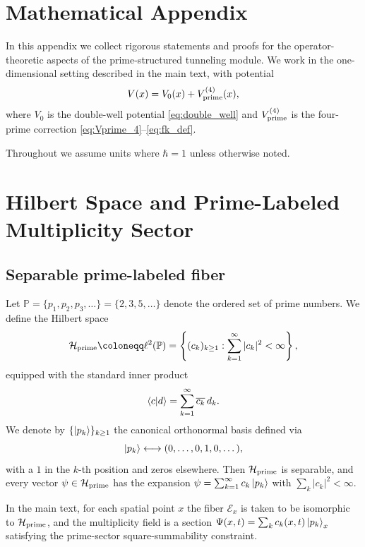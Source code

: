 \documentclass[11pt]{article}
\begin{document}
\appendix
\section*{Mathematical Appendix}

In this appendix we collect rigorous statements and proofs for the
operator-theoretic aspects of the prime-structured tunneling module.
We work in the one-dimensional setting described in the main text, with
potential
\[
  V(x) = V_0(x) + V_{\rm prime}^{(4)}(x),
\]
where \(V_0\) is the double-well potential \eqref{eq:double_well} and
\(V_{\rm prime}^{(4)}\) is the four-prime correction
\eqref{eq:Vprime_4}--\eqref{eq:fk_def}.

Throughout we assume units where \(\hbar = 1\) unless otherwise noted.

\section{Hilbert Space and Prime-Labeled Multiplicity Sector}

\subsection{Separable prime-labeled fiber}

Let \(\mathbb{P} = \{p_1,p_2,p_3,\dots\} = \{2,3,5,\dots\}\) denote the
ordered set of prime numbers. We define the Hilbert space
\begin{equation}
  \mathcal{H}_{\rm prime} \coloneqq \ell^2(\mathbb{P})
  = \left\{ (c_k)_{k\ge 1} : \sum_{k=1}^{\infty} |c_k|^2 < \infty \right\},
\end{equation}
equipped with the standard inner product
\begin{equation}
  \braket{c}{d}
  = \sum_{k=1}^{\infty} \overline{c_k}\,d_k.
\end{equation}
We denote by \(\{\ket{p_k}\}_{k\ge 1}\) the canonical orthonormal basis
defined via
\begin{equation}
  \ket{p_k} \longleftrightarrow (0,\dots,0,1,0,\dots),
\end{equation}
with a \(1\) in the \(k\)-th position and zeros elsewhere. Then
\(\mathcal{H}_{\rm prime}\) is separable, and every vector
\(\psi \in \mathcal{H}_{\rm prime}\) has the expansion
\(\psi = \sum_{k=1}^\infty c_k \ket{p_k}\) with
\(\sum_k|c_k|^2 < \infty\).

In the main text, for each spatial point \(x\) the fiber
\(\mathcal{E}_x\) is taken to be isomorphic to \(\mathcal{H}_{\rm prime}\),
and the multiplicity field is a section
\(\Psi(x,t) = \sum_k c_k(x,t)\ket{p_k}_x\) satisfying the prime-sector
square-summability constraint.
\end{document}
